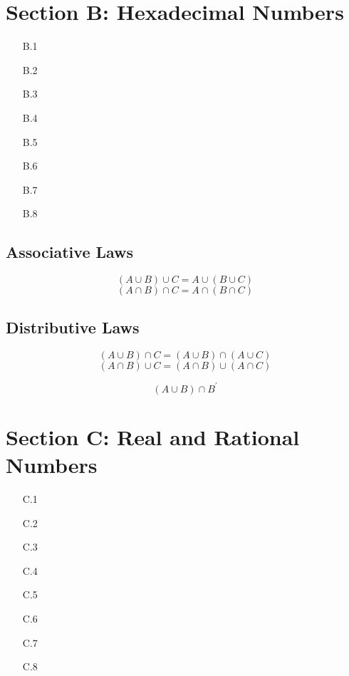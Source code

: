 \section*{Section B: Hexadecimal Numbers}
\begin{itemize}
\item[B.1]
\item[B.2]
\item[B.3]
\item[B.4]
\item[B.5]
\item[B.6]
\item[B.7]
\item[B.8]
\end{itemize}
\newpage


\subsection*{Associative Laws}
\[ (A \cup B) \cup C =  A \cup (B \cup C)  \]
\[ (A \cap B) \cap C =  A \cap (B \cap C)  \]

\subsection*{Distributive Laws}
\[ (A \cup B) \cap C =  (A \cup B) \cap (A \cup C)  \]
\[ (A \cap B) \cup C =  (A \cap B) \cup (A \cap C)  \]


\[ (A \cup B) \cap B^{\prime} \]
\section*{Section C: Real and Rational Numbers}
\begin{itemize}
\item[C.1]
\item[C.2]
\item[C.3]
\item[C.4]
\item[C.5]
\item[C.6]
\item[C.7]
\item[C.8]
\end{itemize}
\newpage
\newpage
